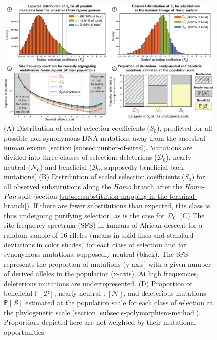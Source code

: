\documentclass[9pt,twocolumn,twoside,lineno]{pnas-new}
\newcommand{\proba}{\mathbb{P}}
\newcommand{\Sphy}{S_{0}}
\newcommand{\SphyDel}{\mathcal{D}_0}
\newcommand{\SphyNeu}{\mathcal{N}_0}
\newcommand{\SphyBen}{\mathcal{B}_0}
\newcommand{\SpopDel}{\mathcal{D}}
\newcommand{\SpopNeu}{\mathcal{N}}
\newcommand{\SpopBen}{\mathcal{B}}
\newcommand{\ProbaPopDel}{\proba [ \SpopDel]}
\newcommand{\ProbaPopNeu}{\proba [ \SpopNeu ]}
\newcommand{\ProbaPopBen}{\proba [ \SpopBen ]}
\begin{document}
\begin{figure}[htb]
       \centering
       \includegraphics[width=17.8cm, page=1]{figure3}
       \caption{
              (A) Distribution of scaled selection coefficients ($\Sphy$), predicted for all possible non-synonymous DNA mutations away from the ancestral human exome (section \ref{subsec:nunber-of-sites}).
              Mutations are divided into three classes of selection: deleterious ($\SphyDel$), nearly-neutral ($\SphyNeu$) and beneficial ($\SphyBen$, supposedly beneficial back-mutations)
              (B) Distribution of scaled selection coefficients ($\Sphy$) for all observed substitutions along the \textit{Homo} branch after the \textit{Homo}-\textit{Pan} split (section \ref{subsec:substitution-mapping-in-the-terminal-branch}).
              If there are fewer substitutions than expected, this class is thus undergoing purifying selection, as is the case for $\SphyDel$.
              (C) The site-frequency spectrum (SFS) in humans of African descent for a random sample of 16 alleles (means in solid lines and standard deviations in color shades) for each class of selection and for synonymous mutations, supposedly neutral (black). The SFS represents the proportion of mutations (y-axis) with a given number of derived alleles in the population (x-axis).
              At high frequencies, deleterious mutations are underrepresented.
              (D) Proportion of beneficial $\ProbaPopDel$, nearly-neutral $\ProbaPopNeu$, and deleterious mutations $\ProbaPopBen$ estimated at the population scale for each class of selection at the phylogenetic scale (section \ref{subsec:s-polymorphism-method}). Proportions depicted here are not weighted by their mutational opportunities.
       }
       \label{fig:homo-afr-results}
\end{figure}
\end{document}

